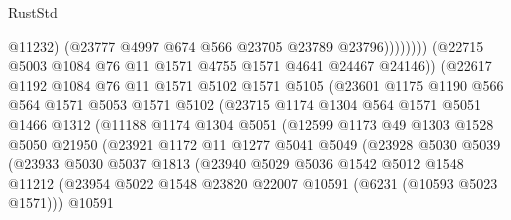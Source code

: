 \begin{lexlean}{RustStd}
\begin{coremodule}
{{                                      @11232)
                                    (@23777 @4997 @674 @566 @23705 @23789 @23796))))))))
                      (@22715 @5003 @1084 @76 @11 @1571 @4755 @1571 @4641 @24467 @24146))
                    (@22617
                      @1192
                      @1084
                      @76
                      @11
                      @1571
                      @5102
                      @1571
                      @5105
                      (@23601
                        @1175
                        @1190
                        @566
                        @564
                        @1571
                        @5053
                        @1571
                        @5102
                        (@23715
                          @1174
                          @1304
                          @564
                          @1571
                          @5051
                          @1466
                          @1312
                          (@11188
                            @1174
                            @1304
                            @5051
                            (@12599
                              @1173
                              @49
                              @1303
                              @1528
                              @5050
                              @21950
                              (@23921
                                @1172
                                @11
                                @1277
                                @5041
                                @5049
                                (@23928
                                  @5030
                                  @5039
                                  (@23933
                                    @5030
                                    @5037
                                    @1813
                                    (@23940
                                      @5029
                                      @5036
                                      @1542
                                      @5012
                                      @1548
                                      @11212
                                      (@23954
                                        @5022
                                        @1548
                                        @23820
                                        @22007
                                        @10591
                                        (@6231 (@10593 @5023 @1571)))
                                      @10591
}}
\end{coremodule}
\end{lexlean}
